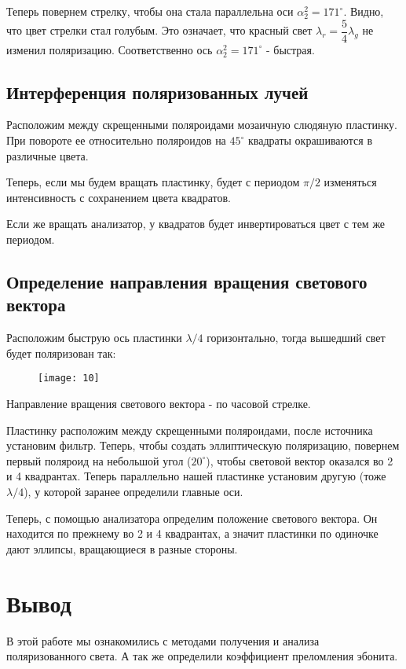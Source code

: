	Теперь повернем стрелку, чтобы она стала параллельна оси $\alpha_2^2 = 171^\circ$. Видно, что цвет стрелки стал голубым. Это означает, что красный свет $\lambda_r = \dfrac{5}{4}\lambda_g$ не изменил поляризацию. Соответственно ось $\alpha_2^2 = 171^\circ$ - быстрая.
	
	\subsection{Интерференция поляризованных лучей}
	Расположим между скрещенными поляроидами мозаичную слюдяную пластинку. При повороте ее относительно поляроидов на $45^\circ$ квадраты окрашиваются в различные цвета. 
	
	Теперь, если мы будем вращать пластинку, будет с периодом $\pi/2$ изменяться интенсивность с сохранением цвета квадратов.
	
	Если же вращать анализатор, у квадратов будет инвертироваться цвет с тем же периодом.
	
	\subsection{Определение направления вращения светового вектора}
		Расположим быструю ось пластинки $\lambda/4$ горизонтально, тогда вышедший свет будет поляризован так:
	\begin{figure}[H]
		\centering
		\texttt{[image: 10]}
	\end{figure}
	Направление вращения светового вектора - по часовой стрелке.
	
	Пластинку расположим между скрещенными поляроидами, после источника установим фильтр. Теперь, чтобы создать эллиптическую поляризацию, повернем первый поляроид на небольшой угол ($20^\circ$), чтобы световой вектор оказался во 2 и 4 квадрантах. Теперь параллельно нашей пластинке установим другую (тоже $\lambda/4$), у которой заранее определили главные оси.
	
	Теперь, с помощью анализатора определим положение светового вектора. Он находится по прежнему во 2 и 4 квадрантах, а значит пластинки по одиночке дают эллипсы, вращающиеся в разные стороны.
	
\section{Вывод}
	В этой работе мы ознакомились с методами получения и анализа поляризованного света. А так же определили коэффициент преломления эбонита.
	
	
	
	
	
	
	
	
	
	
	
	
	
	
	
	
	
	
	

